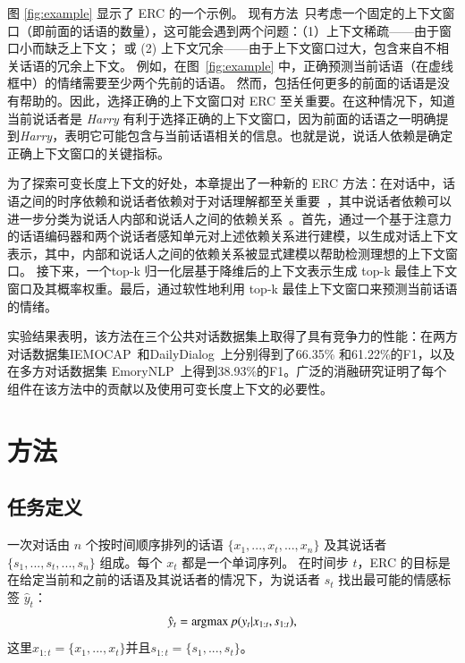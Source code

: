 图 \ref{fig:example} 显示了 ERC 的一个示例。
现有方法~\cite{poria2017context,hazarika2018conversational,hazarika2018icon,majumder2019dialoguernn,ghosal2019dialoguegcn,ghosal2020cosmic,zhong2019knowledge,jiao2020real,jiao-etal-2019-higru}只考虑一个固定的上下文窗口（即前面的话语的数量），这可能会遇到两个问题：（1）上下文稀疏——由于窗口小而缺乏上下文； 或 (2) 上下文冗余——由于上下文窗口过大，包含来自不相关话语的冗余上下文。
例如，在图~\ref{fig:example} 中，正确预测当前话语（在虚线框中）的情绪需要至少两个先前的话语。 然而，包括任何更多的前面的话语是没有帮助的。因此，选择正确的上下文窗口对 ERC 至关重要。在这种情况下，知道当前说话者是 \textit{Harry} 有利于选择正确的上下文窗口，因为前面的话语之一明确提到\textit{Harry}，表明它可能包含与当前话语相关的信息。也就是说，说话人依赖是确定正确上下文窗口的关键指标。

为了探索可变长度上下文的好处，本章提出了一种新的 ERC 方法：在对话中，话语之间的时序依赖和说话者依赖对于对话理解都至关重要~\cite{ghosal2020utterance}，其中说话者依赖可以进一步分类为说话人内部和说话人之间的依赖关系~\cite{ishiwatari2020relation}。首先，通过一个基于注意力的话语编码器和两个说话者感知单元对上述依赖关系进行建模，以生成对话上下文表示，其中，内部和说话人之间的依赖关系被显式建模以帮助检测理想的上下文窗口。 接下来，一个top-k 归一化层基于降维后的上下文表示生成 top-k 最佳上下文窗口及其概率权重。最后，通过软性地利用 top-k 最佳上下文窗口来预测当前话语的情绪。

实验结果表明，该方法在三个公共对话数据集上取得了具有竞争力的性能：在两方对话数据集IEMOCAP~\cite{busso2008iemocap}和DailyDialog~\cite{li2017dailydialog}上分别得到了66.35\% 和61.22\%的F1，以及在多方对话数据集 EmoryNLP~\cite{zahiri2017emotion}上得到38.93\%的F1。广泛的消融研究证明了每个组件在该方法中的贡献以及使用可变长度上下文的必要性。

\section{方法}\label{sec:erc_method}
\subsection{任务定义}
一次对话由 $n$ 个按时间顺序排列的话语 $\{x_1, ..., x_t,...,x_n\}$ 及其说话者 $\{s_1, ..., s_t,...,s_n\}$ 组成。每个 $x_t$ 都是一个单词序列。 在时间步 $t$，ERC 的目标是在给定当前和之前的话语及其说话者的情况下，为说话者 $s_t$ 找出最可能的情感标签 $\hat{y}_t$：
\begin{equation}
    \hat{y}_t =\operatorname*{argmax} p(y_t| x_{1:t}, s_{1:t}), \nonumber
\end{equation}
这里$x_{1:t}=\{x_1,...,x_{t}\}$并且$s_{1:t}=\{s_1,...,s_{t}\}$。


